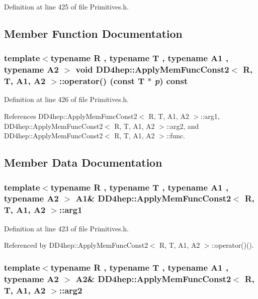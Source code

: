 Definition at line 425 of file Primitives.h.

\subsection{Member Function Documentation}
\hypertarget{struct_d_d4hep_1_1_apply_mem_func_const2_a33cf5c2d4ab30451c66311278dd1b38d}{
\subsubsection[{operator()}]{\setlength{\rightskip}{0pt plus 5cm}template$<$typename R , typename T , typename A1 , typename A2 $>$ void {\bf DD4hep::ApplyMemFuncConst2}$<$ R, {\bf T}, A1, A2 $>$::operator() (const {\bf T} $\ast$ {\em p}) const}}
\label{struct_d_d4hep_1_1_apply_mem_func_const2_a33cf5c2d4ab30451c66311278dd1b38d}


Definition at line 426 of file Primitives.h.

References DD4hep::ApplyMemFuncConst2$<$ R, T, A1, A2 $>$::arg1, DD4hep::ApplyMemFuncConst2$<$ R, T, A1, A2 $>$::arg2, and DD4hep::ApplyMemFuncConst2$<$ R, T, A1, A2 $>$::func.

\subsection{Member Data Documentation}
\hypertarget{struct_d_d4hep_1_1_apply_mem_func_const2_a5017a4de9fd2e68ad5c13d34ffd7c19d}{
\subsubsection[{arg1}]{\setlength{\rightskip}{0pt plus 5cm}template$<$typename R , typename T , typename A1 , typename A2 $>$ A1\& {\bf DD4hep::ApplyMemFuncConst2}$<$ R, {\bf T}, A1, A2 $>$::{\bf arg1}}}
\label{struct_d_d4hep_1_1_apply_mem_func_const2_a5017a4de9fd2e68ad5c13d34ffd7c19d}


Definition at line 423 of file Primitives.h.

Referenced by DD4hep::ApplyMemFuncConst2$<$ R, T, A1, A2 $>$::operator()().\hypertarget{struct_d_d4hep_1_1_apply_mem_func_const2_a96f3779267c92dcb4ff855fd360f62d5}{
\subsubsection[{arg2}]{\setlength{\rightskip}{0pt plus 5cm}template$<$typename R , typename T , typename A1 , typename A2 $>$ A2\& {\bf DD4hep::ApplyMemFuncConst2}$<$ R, {\bf T}, A1, A2 $>$::{\bf arg2}}}
\label{struct_d_d4hep_1_1_apply_mem_func_const2_a96f3779267c92dcb4ff855fd360f62d5}


